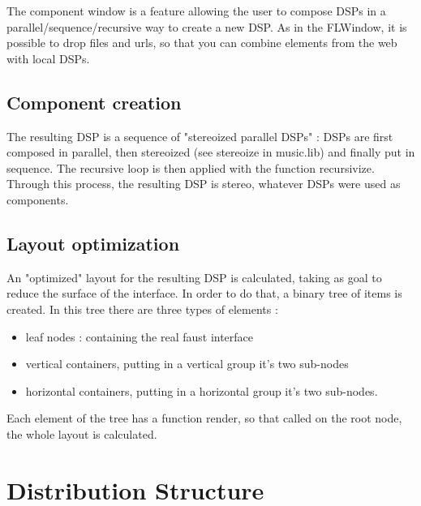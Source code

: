\documentclass[a4paper]{article}
\begin{document}
{The component window is a feature allowing the user to compose DSPs in a parallel/sequence/recursive way to create a new DSP. 
As in the FLWindow, it is possible to drop files and urls, so that you can combine elements from the web with local DSPs.

\subsection{Component creation}

The resulting DSP is a sequence of "stereoized parallel DSPs" : DSPs are first composed in parallel, then stereoized (see stereoize in music.lib) and finally put in sequence. The recursive loop is then applied with the function recursivize. \\
Through this process, the resulting DSP is stereo, whatever DSPs were used as components. 

\subsection{Layout optimization}

An "optimized" layout for the resulting DSP is calculated, taking as goal to reduce the surface of the interface. In order to do that, a binary tree of items is created. In this tree there are three types of elements : 
\begin{itemize}
\item leaf nodes : containing the real faust interface
\item vertical containers, putting in a vertical group it's two sub-nodes
\item horizontal containers, putting in a horizontal group it's two sub-nodes. 
\end{itemize}

Each element of the tree has a function render, so that called on the root node, the whole layout is calculated.

\section{Distribution Structure}

}
\end{document}
